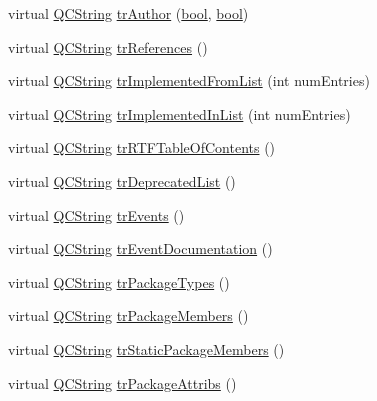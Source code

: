 \begin{DoxyCompactItemize}
\item 
virtual \hyperlink{class_q_c_string}{Q\+C\+String} \hyperlink{class_translator_chinesetraditional_ab96d9f905b0b31764eb86c3085a14520}{tr\+Author} (\hyperlink{qglobal_8h_a1062901a7428fdd9c7f180f5e01ea056}{bool}, \hyperlink{qglobal_8h_a1062901a7428fdd9c7f180f5e01ea056}{bool})
\item 
virtual \hyperlink{class_q_c_string}{Q\+C\+String} \hyperlink{class_translator_chinesetraditional_a52e273de98bc9cb2b95f4c2316848a26}{tr\+References} ()
\item 
virtual \hyperlink{class_q_c_string}{Q\+C\+String} \hyperlink{class_translator_chinesetraditional_a9b081ef4ec88e0e25d04824351a77089}{tr\+Implemented\+From\+List} (int num\+Entries)
\item 
virtual \hyperlink{class_q_c_string}{Q\+C\+String} \hyperlink{class_translator_chinesetraditional_a0e333fc233c2a61076715266cb684c77}{tr\+Implemented\+In\+List} (int num\+Entries)
\item 
virtual \hyperlink{class_q_c_string}{Q\+C\+String} \hyperlink{class_translator_chinesetraditional_afa9fb73edd1669644f8631c983d94913}{tr\+R\+T\+F\+Table\+Of\+Contents} ()
\item 
virtual \hyperlink{class_q_c_string}{Q\+C\+String} \hyperlink{class_translator_chinesetraditional_a028e21ebc33dffcd502982aa7fa64503}{tr\+Deprecated\+List} ()
\item 
virtual \hyperlink{class_q_c_string}{Q\+C\+String} \hyperlink{class_translator_chinesetraditional_ad83304224ff49e184e4e14624f8ec300}{tr\+Events} ()
\item 
virtual \hyperlink{class_q_c_string}{Q\+C\+String} \hyperlink{class_translator_chinesetraditional_abbe57b2f5a4ce7b21871953016d4217e}{tr\+Event\+Documentation} ()
\item 
virtual \hyperlink{class_q_c_string}{Q\+C\+String} \hyperlink{class_translator_chinesetraditional_acf06113451a4b7429244afb10279857a}{tr\+Package\+Types} ()
\item 
virtual \hyperlink{class_q_c_string}{Q\+C\+String} \hyperlink{class_translator_chinesetraditional_aa67be8f3476106a7ffc1a07a66ff4189}{tr\+Package\+Members} ()
\item 
virtual \hyperlink{class_q_c_string}{Q\+C\+String} \hyperlink{class_translator_chinesetraditional_a1bda44c8593eb149e18425fd8a10ec3d}{tr\+Static\+Package\+Members} ()
\item 
virtual \hyperlink{class_q_c_string}{Q\+C\+String} \hyperlink{class_translator_chinesetraditional_a3df74e7c393faf110b039fd8c52df59c}{tr\+Package\+Attribs} ()

\end{DoxyCompactItemize}
